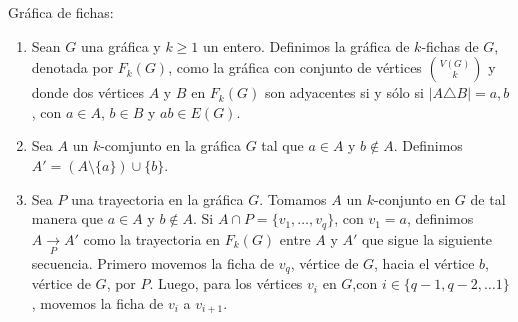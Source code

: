 \begin{definicion} Gr\'afica de fichas:
    \label{def:fichas}


    \begin{enumerate}
        \item Sean $G$ una gr\'afica y $k \geq 1$ un entero. Definimos la
        gr\'afica de $k$-fichas de $G$, denotada por $F_k(G)$, como la
        gr\'afica con conjunto de v\'ertices $\binom{V(G)}{k}$ y donde dos
        v\'ertices $A$ y $B$ en $F_k(G)$ son adyacentes si y s\'olo si $|A
        \triangle B| ={a,b}$, con $a \in A$, $b \in B$ y $ab \in E(G)$.
        \item Sea $A$ un $k$-comjunto en la gr\'afica $G$ tal que $a \in A$
        y $b\notin A$. Definimos $A'= (A \setminus \{a\}) \cup \{b\}$.
        \item Sea $P$ una trayectoria en la gr\'afica $G$. Tomamos $A$ un
        $k$-conjunto en $G$ de tal manera que $a\in A$ y $b \notin A$. Si
        $A\cap P =\{v_1, \dots, v_q\}$, con $v_1 = a$, definimos $A
        \xrightarrow[P]{} A'$ como la trayectoria en $F_k(G)$ entre $A$ y
        $A'$ que sigue la siguiente secuencia. Primero movemos la ficha de
        $v_q$, v\'ertice de $G$, hacia el v\'ertice $b$, v\'ertice de $G$,
        por $P$. Luego, para los v\'ertices $v_i$ en $G$,con $i \in \{q-1,
        q-2, \dots 1\}$, movemos la ficha de $v_i$ a $v_{i+1}$. 
    \end{enumerate}
\end{definicion}

